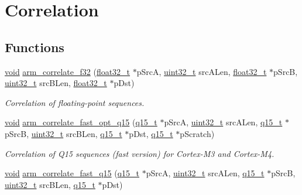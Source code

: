 \hypertarget{group___corr}{\section{Correlation}
\label{group___corr}
}
\subsection*{Functions}
\begin{DoxyCompactItemize}
\item 
\hyperlink{group___n_a_m_e_ga18028b8badbf1ea7e704ccac3c488e82}{void} \hyperlink{group___corr_ga22021e4222773f01e9960358a531cfb8}{arm\-\_\-correlate\-\_\-f32} (\hyperlink{arm__math_8h_a4611b605e45ab401f02cab15c5e38715}{float32\-\_\-t} $\ast$p\-Src\-A, \hyperlink{stdint_8h_a435d1572bf3f880d55459d9805097f62}{uint32\-\_\-t} src\-A\-Len, \hyperlink{arm__math_8h_a4611b605e45ab401f02cab15c5e38715}{float32\-\_\-t} $\ast$p\-Src\-B, \hyperlink{stdint_8h_a435d1572bf3f880d55459d9805097f62}{uint32\-\_\-t} src\-B\-Len, \hyperlink{arm__math_8h_a4611b605e45ab401f02cab15c5e38715}{float32\-\_\-t} $\ast$p\-Dst)
\begin{DoxyCompactList}\small\item\em Correlation of floating-\/point sequences. \end{DoxyCompactList}\item 
\hyperlink{group___n_a_m_e_ga18028b8badbf1ea7e704ccac3c488e82}{void} \hyperlink{group___corr_ga40a0236b17220e8e22a22b5bc1c53c6b}{arm\-\_\-correlate\-\_\-fast\-\_\-opt\-\_\-q15} (\hyperlink{arm__math_8h_ab5a8fb21a5b3b983d5f54f31614052ea}{q15\-\_\-t} $\ast$p\-Src\-A, \hyperlink{stdint_8h_a435d1572bf3f880d55459d9805097f62}{uint32\-\_\-t} src\-A\-Len, \hyperlink{arm__math_8h_ab5a8fb21a5b3b983d5f54f31614052ea}{q15\-\_\-t} $\ast$p\-Src\-B, \hyperlink{stdint_8h_a435d1572bf3f880d55459d9805097f62}{uint32\-\_\-t} src\-B\-Len, \hyperlink{arm__math_8h_ab5a8fb21a5b3b983d5f54f31614052ea}{q15\-\_\-t} $\ast$p\-Dst, \hyperlink{arm__math_8h_ab5a8fb21a5b3b983d5f54f31614052ea}{q15\-\_\-t} $\ast$p\-Scratch)
\begin{DoxyCompactList}\small\item\em Correlation of Q15 sequences (fast version) for Cortex-\/\-M3 and Cortex-\/\-M4. \end{DoxyCompactList}\item 
\hyperlink{group___n_a_m_e_ga18028b8badbf1ea7e704ccac3c488e82}{void} \hyperlink{group___corr_gac8de3da44f58e86c2c86156276ca154f}{arm\-\_\-correlate\-\_\-fast\-\_\-q15} (\hyperlink{arm__math_8h_ab5a8fb21a5b3b983d5f54f31614052ea}{q15\-\_\-t} $\ast$p\-Src\-A, \hyperlink{stdint_8h_a435d1572bf3f880d55459d9805097f62}{uint32\-\_\-t} src\-A\-Len, \hyperlink{arm__math_8h_ab5a8fb21a5b3b983d5f54f31614052ea}{q15\-\_\-t} $\ast$p\-Src\-B, \hyperlink{stdint_8h_a435d1572bf3f880d55459d9805097f62}{uint32\-\_\-t} src\-B\-Len, \hyperlink{arm__math_8h_ab5a8fb21a5b3b983d5f54f31614052ea}{q15\-\_\-t} $\ast$p\-Dst)

\end{DoxyCompactItemize}
